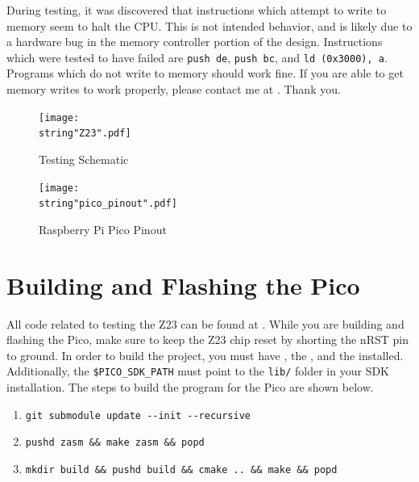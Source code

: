 \documentclass[10pt]{article}
\newcommand{\hrefblue}[3][blue]{\href{#2}{\color{#1}{#3}}}%
\begin{document}
\begin{mdframed}[frametitle=Hardware Bug Discovered During Testing]
	During testing, it was discovered that instructions which attempt to write to memory seem
	to halt the CPU. This is not intended behavior, and is likely due to a hardware bug in the memory
	controller portion of the design. Instructions which were tested to have failed are \verb|push de|,
	\verb|push bc|, and \verb|ld (0x3000), a|. Programs which do not write to memory should work fine.
	If you are able to get memory writes to work properly, please contact me at
	\hrefblue{mailto:singh956@purdue.edu}{singh956@purdue.edu}. Thank you.
\end{mdframed}

\begin{figure}[H]
	\texttt{[image: \\string"Z23".pdf]}
	\caption{Testing Schematic}
	\label{fig:test_schm}
\end{figure}

\begin{figure}[H]
	\texttt{[image: \\string"pico\_pinout".pdf]}
	\caption{Raspberry Pi Pico Pinout}
	\label{fig:rpp_pinout}
\end{figure}

\section{Building and Flashing the Pico}
All code related to testing the Z23 can be found at
\hrefblue{https://github.com/devins2518/z23-bringup}{this Github repository}. While you are building
and flashing the Pico, make sure to keep the Z23 chip reset by shorting the nRST pin to ground. In
order to build the project, you must have \hrefblue{https://cmake.org}{cmake}, the
\hrefblue{https://github.com/raspberrypi/pico-sdk}{Pico SDK}, and the
\hrefblue{https://developer.arm.com/Tools\%20and\%20Software/GNU\%20Toolchain}{ARM GNU Toolchain}
installed. Additionally, the \verb|$PICO_SDK_PATH| must point to the \verb|lib/| folder in your SDK
installation. The steps to build the program for the Pico are shown below.

\begin{enumerate}
	\item \verb|git submodule update --init --recursive|
	\item \verb|pushd zasm && make zasm && popd|
	\item \verb|mkdir build && pushd build && cmake .. && make && popd|
\end{enumerate}
\end{document}
